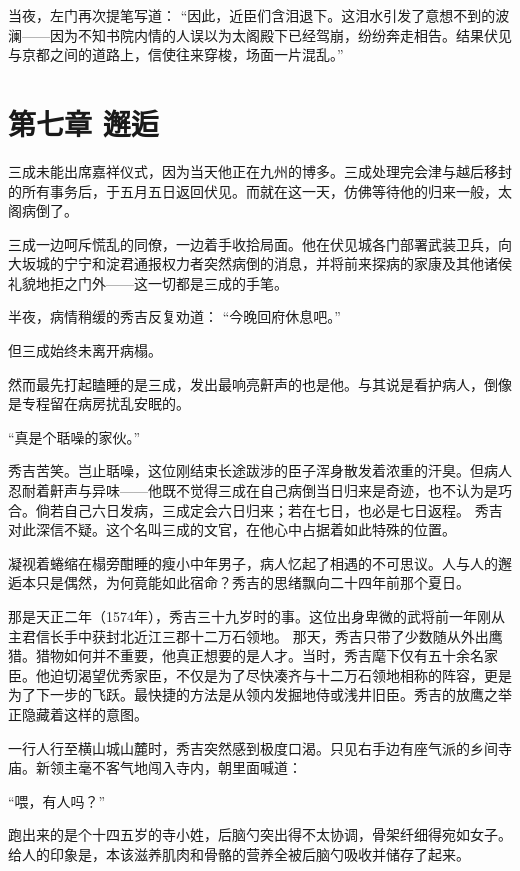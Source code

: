 \documentclass[
]{article}
\begin{document}
当夜，左门再次提笔写道：
``因此，近臣们含泪退下。这泪水引发了意想不到的波澜------因为不知书院内情的人误以为太阁殿下已经驾崩，纷纷奔走相告。结果伏见与京都之间的道路上，信使往来穿梭，场面一片混乱。''

\section*{第七章 邂逅}\label{ux7b2cux4e03ux7ae0-ux9082ux9005}

三成未能出席嘉祥仪式，因为当天他正在九州的博多。三成处理完会津与越后移封的所有事务后，于五月五日返回伏见。而就在这一天，仿佛等待他的归来一般，太阁病倒了。

三成一边呵斥慌乱的同僚，一边着手收拾局面。他在伏见城各门部署武装卫兵，向大坂城的宁宁和淀君通报权力者突然病倒的消息，并将前来探病的家康及其他诸侯礼貌地拒之门外------这一切都是三成的手笔。

半夜，病情稍缓的秀吉反复劝道：
``今晚回府休息吧。''

但三成始终未离开病榻。

然而最先打起瞌睡的是三成，发出最响亮鼾声的也是他。与其说是看护病人，倒像是专程留在病房扰乱安眠的。

``真是个聒噪的家伙。''

秀吉苦笑。岂止聒噪，这位刚结束长途跋涉的臣子浑身散发着浓重的汗臭。但病人忍耐着鼾声与异味------他既不觉得三成在自己病倒当日归来是奇迹，也不认为是巧合。倘若自己六日发病，三成定会六日归来；若在七日，也必是七日返程。
秀吉对此深信不疑。这个名叫三成的文官，在他心中占据着如此特殊的位置。

凝视着蜷缩在榻旁酣睡的瘦小中年男子，病人忆起了相遇的不可思议。人与人的邂逅本只是偶然，为何竟能如此宿命？秀吉的思绪飘向二十四年前那个夏日。

那是天正二年（1574年），秀吉三十九岁时的事。这位出身卑微的武将前一年刚从主君信长手中获封北近江三郡十二万石领地。
那天，秀吉只带了少数随从外出鹰猎。猎物如何并不重要，他真正想要的是人才。当时，秀吉麾下仅有五十余名家臣。他迫切渴望优秀家臣，不仅是为了尽快凑齐与十二万石领地相称的阵容，更是为了下一步的飞跃。最快捷的方法是从领内发掘地侍或浅井旧臣。秀吉的放鹰之举正隐藏着这样的意图。

一行人行至横山城山麓时，秀吉突然感到极度口渴。只见右手边有座气派的乡间寺庙。新领主毫不客气地闯入寺内，朝里面喊道：

``喂，有人吗？''

跑出来的是个十四五岁的寺小姓，后脑勺突出得不太协调，骨架纤细得宛如女子。给人的印象是，本该滋养肌肉和骨骼的营养全被后脑勺吸收并储存了起来。
\end{document}
